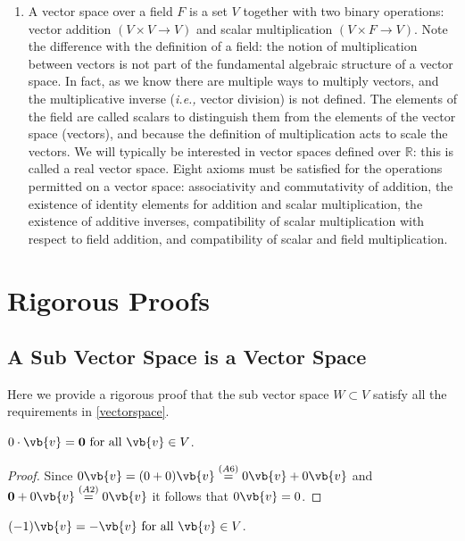 \documentclass[a4paper,12pt]{report}
\begin{document}
\begin{appendices}
\begin{enumerate}
\item  A vector space over a field \( F \) is a set \( V \) together with two binary operations: vector addition \( (V \times V \to V) \) and scalar multiplication \( (V \times F \to V) \). Note the difference with the definition of a field: the notion of multiplication between vectors is not part of the fundamental algebraic structure of a vector space. In fact, as we know there are multiple ways to multiply vectors, and the multiplicative inverse (\textit{i.e.,}  vector division) is not defined. The elements of the field are called scalars to distinguish them from the elements of the vector space (vectors), and because the definition of multiplication acts to scale the vectors. We will typically be interested in vector spaces defined over \( \mathbb{R} \): this is called a real vector space. Eight axioms must be satisfied for the operations permitted on a vector space: associativity and commutativity of addition, the existence of identity elements for addition and scalar multiplication, the existence of additive inverses, compatibility of scalar multiplication with respect to field addition, and compatibility of scalar and field multiplication.
\end{enumerate}

\chapter{Rigorous Proofs}

\section{A Sub Vector Space is a Vector Space} \label{subvectorvector} 

Here we provide a rigorous proof that the sub vector space \(W \subset V\) satisfy all the requirements in \cref{vectorspace}.
\begin{lemma}
    \(0 \cdot \vb{v} = \boldsymbol{0} \text{ for all } \vb{v} \in V\).  
\end{lemma}
    
\begin{proof}
    Since \(0\vb{v} = (0+0)\vb{v} \stackrel{(A6)}{=} 0\vb{v} + 0\vb{v} \) and \(\boldsymbol{0} + 0\vb{v} \stackrel{(A2)}{=}  0\vb{v}  \) it follows that \(0\vb{v} =0\).  
\end{proof}
    
\begin{lemma} 
        \((-1)\vb{v} = -\vb{v} \text{ for all }\vb{v} \in V\). 
\end{lemma}
        

\end{appendices}
\end{document}
